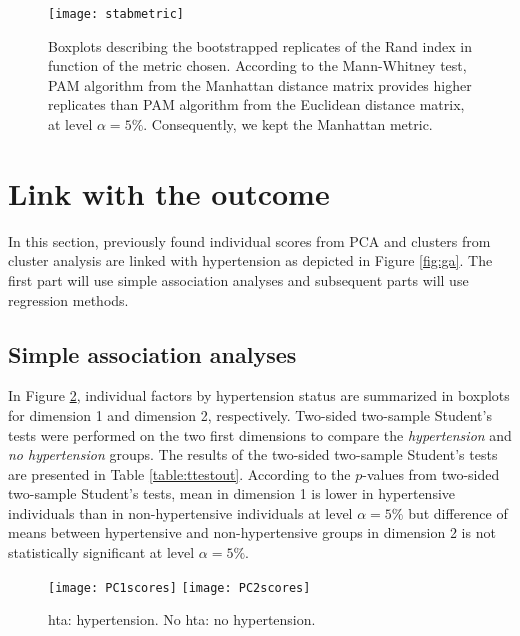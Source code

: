 \begin{figure}
\centering
\captionsetup{singlelinecheck = false, format= hang, justification=raggedright, font=small, labelsep=space}
\texttt{[image: stabmetric]}
  \label{fig:boot}
\begin{flushleft}
{\footnotesize Boxplots describing the bootstrapped replicates of the Rand index in function of the metric chosen. According to the Mann-Whitney test, PAM algorithm from the Manhattan distance matrix provides higher replicates than PAM algorithm from the Euclidean distance matrix, at level $\alpha=5\%$. Consequently, we kept the Manhattan metric.}
\end{flushleft}
\end{figure}

\section{Link with the outcome}
In this section, previously found individual scores from PCA and clusters from cluster analysis are linked with hypertension as depicted in Figure \ref{fig:ga}. The first part will use simple association analyses and subsequent parts will use regression methods.

\subsection{Simple association analyses}
In Figure \ref{fig:PCscores}, individual factors by hypertension status are summarized in boxplots for dimension 1 and dimension 2, respectively. Two-sided two-sample Student’s tests were performed on the two first dimensions to compare the \emph{hypertension} and \emph{no hypertension} groups. The results of the two-sided two-sample Student’s tests are presented in Table \ref{table:ttestout}. According to the $p$-values from two-sided two-sample Student’s tests, mean in dimension 1 is lower in hypertensive individuals than in non-hypertensive individuals at level $\alpha=5\%$ but difference of means between hypertensive and non-hypertensive groups in dimension 2 is not statistically significant at level $\alpha=5\%$.

\begin{figure}
\centering
\captionsetup{singlelinecheck = false, format= hang, justification=raggedright, font=small, labelsep=space}
\texttt{[image: PC1scores]} \hfill
\texttt{[image: PC2scores]} 
\label{fig:PCscores}
\begin{flushleft}
{\footnotesize hta: hypertension. No hta: no hypertension.}
\end{flushleft}
\end{figure}

